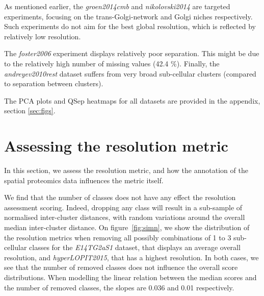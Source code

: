\documentclass[12pt]{article}\usepackage[]{graphicx}\usepackage[]{color}
\begin{document}
As mentioned earlier, the \textit{groen2014cmb} and
\textit{nikolovski2014} are targeted experiments, focusing on the
trans-Golgi-network and Golgi niches respectively. Such experiments do
not aim for the best global resolution, which is reflected by relatively
low resolution.

The \textit{foster2006} experiment displays relatively poor
separation. This might be due to the relatively high number of missing
values (42.4 \%). Finally, the \textit{andreyev2010rest} dataset suffers from
very broad sub-cellular clusters (compared to separation between
clusters).


\bigskip

The PCA plots and QSep heatmaps for all datasets are provided in the
appendix, section \ref{sec:figs}.










\section{Assessing the resolution metric}\label{sec:qsepassess}

In this section, we assess the resolution metric, and how the
annotation of the spatial proteomics data influences the metric
itself.



We find that the number of classes does not have any effect the resolution
assessment scoring. Indeed, dropping any class will result in a
sub-sample of normalised inter-cluster distances, with random
variations around the overall median inter-cluster distance. On
figure~\ref{fig:simn}, we show the distribution of the resolution
metrics when removing all possibly combinations of 1 to 3 sub-cellular
classes for the \textit{E14TG2aS1} dataset, that displays an average
overall resolution, and \textit{hyperLOPIT2015}, that has a highest
resolution. In both cases, we see that the number of removed classes
does not influence the overall score distributions. When modelling the
linear relation between the median scores and the number of removed
classes, the slopes are 0.036 and
0.01 respectively.
\end{document}
